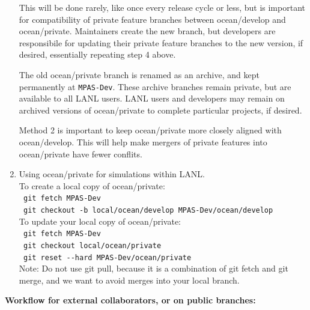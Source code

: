 \documentclass[11pt]{article}
\begin{document}
\begin{enumerate}
This will be done rarely, like once every release cycle or less, but is important for compatibility of private feature branches between ocean/develop and ocean/private.  Maintainers create the new branch, but developers are responsibile for updating their private feature branches to the new version, if desired, essentially repeating step 4 above.

The old ocean/private branch is renamed as an archive, and kept permanently at \verb|MPAS-Dev|.  These archive branches remain private, but are available to all LANL users.  LANL users and developers may remain on archived versions of ocean/private to complete particular projects, if desired.

Method 2 is important to keep ocean/private more closely aligned with ocean/develop.  This will help make mergers of private features into ocean/private have fewer conflits.

\clearpage

\item Using ocean/private for simulations within LANL. \\

To create a local copy of ocean/private:\\
\verb| git fetch MPAS-Dev| \\
\verb| git checkout -b local/ocean/develop MPAS-Dev/ocean/develop | \\

To update your local copy of ocean/private:\\
\verb| git fetch MPAS-Dev| \\
\verb| git checkout local/ocean/private| \\
\verb| git reset --hard MPAS-Dev/ocean/private | \\
Note: Do not use git pull, because it is a combination of git fetch and git merge, and we want to avoid merges into your local branch.

\end{enumerate}


\clearpage

{\bf Workflow for external collaborators, or on public branches:}
\end{document}
